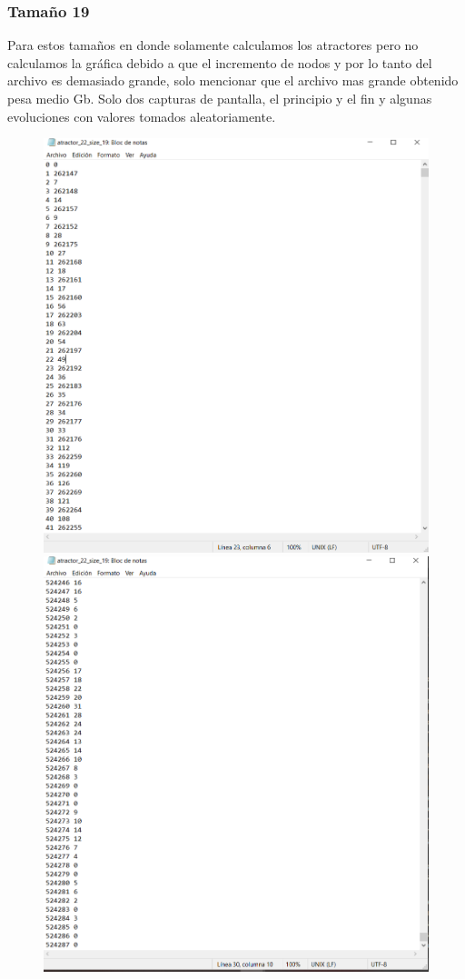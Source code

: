 \documentclass[11pt]{article}
\begin{document}
			\subsubsection{Tamaño 19}
			Para estos tamaños en donde solamente calculamos los atractores pero no calculamos la gráfica debido a que el incremento de nodos y por lo tanto del archivo es demasiado grande, solo mencionar que el archivo mas grande obtenido pesa medio Gb. Solo dos capturas de pantalla, el principio y el fin y algunas evoluciones con valores tomados aleatoriamente.
			\begin{figure}[H]
			\centering
			\includegraphics[scale=0.3]{resources/Atractores22/atractor_22_size_19.png}
			\includegraphics[scale=0.3]{resources/Atractores22/atractor_22_size_191.png}

\end{figure}
\end{document}
